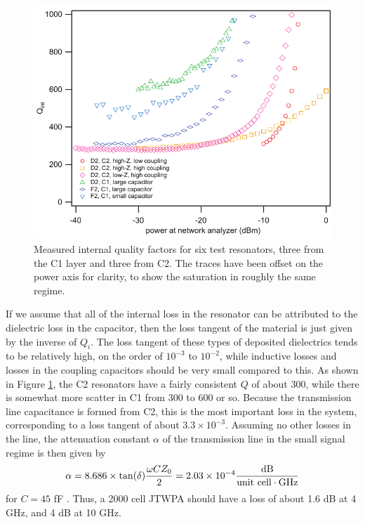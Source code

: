 \begin{figure}
\begin{center}
\includegraphics[width=4.75in]{twpa_exp/Qint}
\end{center}
\caption[Test resonator quality factor measurements]{Measured internal quality factors for six test resonators, three from the C1 layer and three from C2.  The traces have been offset on the power axis for clarity, to show the saturation in roughly the same regime.}
\label{fig:Qint}
\end{figure}

If we assume that all of the internal loss in the resonator can be attributed to the dielectric loss in the capacitor, then the loss tangent of the material is just given by the inverse of $Q_i$.  The loss tangent of these types of deposited dielectrics tends to be relatively high, on the order of $10^{-3}$ to $10^{-2}$, while inductive losses and losses in the coupling capacitors should be very small compared to this.  As shown in Figure \ref{fig:Qint}, the C2 resonators have a fairly consistent $Q$ of about 300, while there is somewhat more scatter in C1 from 300 to 600 or so.  Because the transmission line capacitance is formed from C2, this is the most important loss in the system, corresponding to a loss tangent of about $3.3 \times 10^{-3}$.  Assuming no other losses in the line, the attenuation constant $\alpha$ of the transmission line in the small signal regime is then given by
\begin{equation}
\alpha = 8.686 \times \tan(\delta) \frac{\omega C Z_0}{2} = 2.03 \times 10^{-4} \frac{\mathrm{dB}}{\textrm{unit cell} \cdot \rm GHz}
\end{equation}
for $C = 45$ fF \cite{pozar1997microwave}.  Thus, a 2000 cell JTWPA should have a loss of about 1.6 dB at 4 GHz, and 4 dB at 10 GHz.

